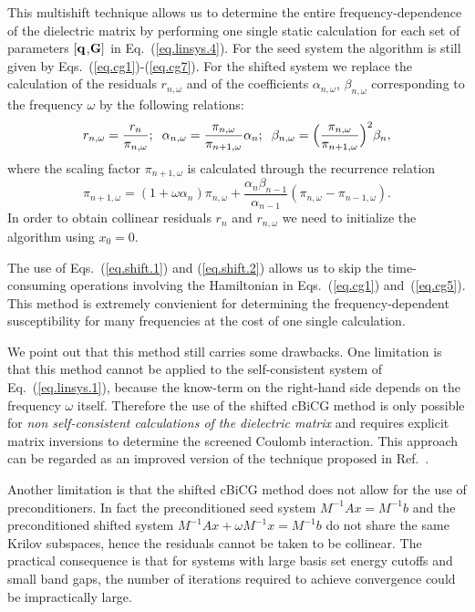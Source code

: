 \documentclass[twocolumn,prb,showpacs,superscriptaddress]{revtex4}
\def\w{\omega}
\def\q{{\bf q}}
\def\G{{\bf G}}
\begin{document}
This multishift technique allows us to determine the
entire frequency-dependence of the dielectric matrix
by performing one single static calculation for each set of parameters $[\q$,$\G]$ in
Eq.\ (\ref{eq.linsys.4}).
For the seed system the algorithm is still given by Eqs.\ (\ref{eq.cg1})-(\ref{eq.cg7}).
For the shifted system we replace the calculation of the residuals
$r_{n,\w}$ and of the coefficients $\alpha_{n,\w}$, $\beta_{n,\w}$ corresponding
to the frequency $\w$ by the following relations:
  \begin{equation} \label{eq.shift.1}
  r_{n,\w}  =\frac{r_n}{\pi_{n,\w}};
  \hspace{0.2cm}
  \alpha_{n,\w}  =  \frac{\pi_{n,\w}}{\pi_{n+1,\w}}\alpha_n ;
  \hspace{0.2cm}
  \beta_{n,\w}  =  \Big(\frac{\pi_{n,\w}}{\pi_{n+1,\w}}\Big)^2\beta_n,
  \end{equation}
where the scaling factor $\pi_{n+1,\w}$ is calculated through the recurrence relation
  \begin{equation}\label{eq.shift.2}
  \pi_{n+1,\w} = (1+\w\alpha_n) \pi_{n,\w} + \frac{\alpha_n\beta_{n-1}}{\alpha_{n-1}}(\pi_{n,\w}-\pi_{n-1,\w}).
  \end{equation}
In order to obtain collinear residuals $r_n$ and $r_{n,\w}$ we need to
initialize the algorithm using $x_0=0$.

The use of Eqs.~(\ref{eq.shift.1}) and (\ref{eq.shift.2}) allows us to
skip the time-consuming operations involving the Hamiltonian in
Eqs.\ (\ref{eq.cg1}) and~(\ref{eq.cg5}).
This method is extremely convienient for determining the frequency-dependent
susceptibility for many frequencies at the cost of one single calculation.

We point out that this method still carries some drawbacks.
One limitation is that this method cannot be applied to the self-consistent
system of Eq.\ (\ref{eq.linsys.1}), because the know-term on the
right-hand side depends on the frequency $\w$ itself.
Therefore the use of the shifted cBiCG method is only possible
for {\it non self-consistent calculations of the dielectric matrix}
and requires explicit matrix inversions to determine the screened
Coulomb interaction.
This approach can be regarded as an improved version 
of the technique proposed in Ref.\ .

Another limitation is that the shifted cBiCG method
does not allow for the use of preconditioners. In fact
the preconditioned seed system $M^{-1}Ax=M^{-1}b$ and the preconditioned shifted system
$M^{-1}Ax+\w M^{-1}x=M^{-1}b$ do not share the same Krilov subspaces, 
hence the residuals cannot be taken to be collinear.\cite{simoncini} 
The practical consequence is that for systems with
large basis set energy cutoffs and small band gaps, the number of iterations
required to achieve convergence could be impractically large.
\end{document}
